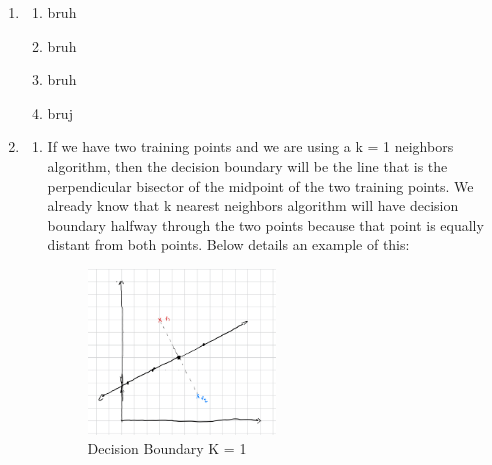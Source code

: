 \documentclass[12pt]{article}
\begin{document}
\begin{enumerate}
\item 
\begin{enumerate}
\item bruh
\item bruh 
\item bruh 
\item bruj
\end{enumerate}

\item
\begin{enumerate}
\item If we have two training points and we are using a k = 1 neighbors algorithm, then the decision boundary will be the line that is the perpendicular bisector of the midpoint of the two training points. We already know that k nearest neighbors algorithm will have decision boundary halfway through the two points because that point is equally distant from both points. Below details an example of this: \\ 
\begin{figure}[H]
  \centering
  \includegraphics[width=0.5\textwidth]{2_a.jpeg}
  \caption{Decision Boundary K = 1}
  \label{fig:boundary}


\end{figure}
\end{enumerate}
\end{enumerate}
\end{document}
